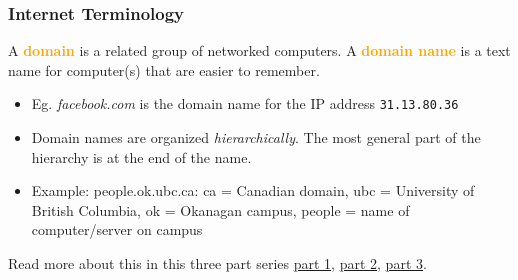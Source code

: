 \documentclass[xcolor=svgnames]{beamer}
\newcommand{\define}[1]{\textbf{\textcolor{orange}{#1}}}
\newcommand{\ft}[1]{\frametitle{#1}}
\begin{document}
\begin{frame}\ft{Internet Terminology}
\vfill
 A \define{domain} is a related group of networked computers. A \define{domain name} is a text name for computer(s) that are easier to remember. 
\begin{itemize}
\vfill
\item Eg. \emph{facebook.com} is the domain name for the IP address {\tt 31.13.80.36}
\vfill
\item Domain names are organized \emph{hierarchically}.  The most general part of the hierarchy is at the end of the name. 
\vfill
\item Example:  people.ok.ubc.ca:
ca = Canadian domain, ubc = University of British Columbia, ok = Okanagan campus, people = name of computer/server on campus 
\vfill
\end{itemize}
Read more about this in this three part series \href{https://www.spiria.com/en/blog/internet/understanding-the-internet-part-1-ip-addressing-and-ports/}{part 1}, \href{https://www.spiria.com/en/blog/internet/understanding-the-internet-part-2-domain-names/}{part 2}, \href{https://www.spiria.com/en/blog/internet/understanding-the-internet-part-3-practical-applications/}{part 3}.
\vfill
\end{frame}







\end{document}
